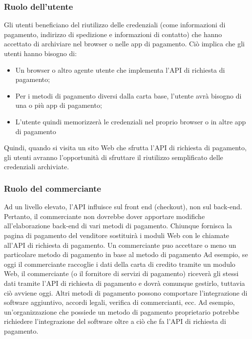\documentclass[italian]{article}
\begin{document}
	\subsubsection{Ruolo dell'utente}
	Gli utenti beneficiano del riutilizzo delle credenziali (come informazioni di pagamento, indirizzo di spedizione e informazioni di contatto) che hanno accettato di archiviare nel browser o nelle app di pagamento. Ciò implica che gli utenti hanno bisogno di:
	\begin{itemize}
		\item Un browser o altro agente utente che implementa l'API di richiesta di pagamento; 
		\item Per i metodi di pagamento diversi dalla carta base, l'utente avrà bisogno di una o più app di pagamento; 
		\item L'utente quindi memorizzerà le credenziali nel proprio browser o in altre app di pagamento
	\end{itemize}
	\begin{flushleft}
		Quindi, quando si visita un sito Web che sfrutta l'API di richiesta di pagamento, gli utenti avranno l'opportunità di sfruttare il riutilizzo semplificato delle credenziali archiviate.
	\end{flushleft}


	\subsubsection{Ruolo del commerciante}
	Ad un livello elevato, l'API influisce sul front end (checkout), non sul back-end. Pertanto, il commerciante non dovrebbe dover apportare modifiche all'elaborazione back-end di vari metodi di pagamento.
	Chiunque fornisca la pagina di pagamento del venditore sostituirà i moduli Web con le chiamate all'API di richiesta di pagamento.
	Un commerciante puo accettare o meno un particolare metodo di pagamento in base al metodo di pagamento
	Ad esempio, se oggi il commerciante raccoglie i dati della carta di credito tramite un modulo Web, il commerciante (o il fornitore di servizi di pagamento) riceverà gli stessi dati tramite l'API di richiesta di pagamento e dovrà comunque gestirlo, tuttavia ciò avviene oggi.
	Altri metodi di pagamento possono comportare l'integrazione di software aggiuntivo, accordi legali, verifica di commercianti, ecc. Ad esempio, un'organizzazione che possiede un metodo di pagamento proprietario potrebbe richiedere l'integrazione del software oltre a ciò che fa l'API di richiesta di pagamento.
	
\end{document}
